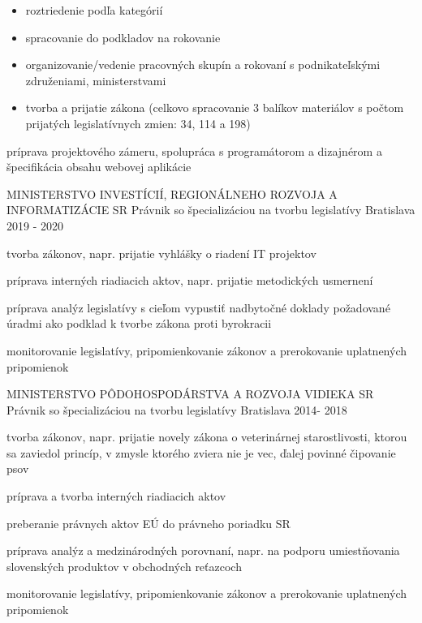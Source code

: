 \begin{cventries}
{\begin{cvitems}
\begin{itemize}[leftmargin=3ex, label=\bullet]
          \item {roztriedenie podľa kategórií}
          \item {spracovanie do podkladov na rokovanie}
          \item {organizovanie/vedenie pracovných skupín a rokovaní s podnikateľskými združeniami, ministerstvami}
          \item {tvorba a prijatie zákona (celkovo spracovanie 3 balíkov materiálov s počtom prijatých legislatívnych zmien: 34, 114 a 198)}
        \end{itemize}
        \item {príprava projektového zámeru, spolupráca s programátorom a dizajnérom a špecifikácia obsahu webovej aplikácie}
      \end{cvitems}
    }

  \cventry
    {MINISTERSTVO INVESTÍCIÍ, REGIONÁLNEHO ROZVOJA A INFORMATIZÁCIE SR} %
    {Právnik so špecializáciou na tvorbu legislatívy} %
    {Bratislava} %
    {2019 - 2020} %
    {
      \begin{cvitems} %
        \item {tvorba zákonov, napr. prijatie vyhlášky o riadení IT projektov}
        \item {príprava interných riadiacich aktov, napr. prijatie metodických usmernení}
        \item {príprava analýz legislatívy s cieľom vypustiť nadbytočné doklady požadované úradmi ako podklad k tvorbe zákona proti byrokracii}
        \item {monitorovanie legislatívy, pripomienkovanie zákonov a prerokovanie uplatnených pripomienok}
      \end{cvitems}
    }

  \cventry
    {MINISTERSTVO PÔDOHOSPODÁRSTVA A ROZVOJA VIDIEKA SR} %
    {Právnik so špecializáciou na tvorbu legislatívy} %
    {Bratislava} %
    {2014- 2018} %
    {
      \begin{cvitems} %
        \item {tvorba zákonov, napr. prijatie novely zákona o veterinárnej starostlivosti, ktorou sa zaviedol princíp, v zmysle ktorého zviera nie je vec, ďalej povinné čipovanie psov}
        \item {príprava a tvorba interných riadiacich aktov}
        \item {preberanie právnych aktov EÚ do právneho poriadku SR}
        \item {príprava analýz a medzinárodných porovnaní, napr. na podporu umiestňovania slovenských produktov v obchodných reťazcoch}
        \item {monitorovanie legislatívy, pripomienkovanie zákonov a prerokovanie uplatnených pripomienok}
      \end{cvitems}
    }


\end{cventries}
